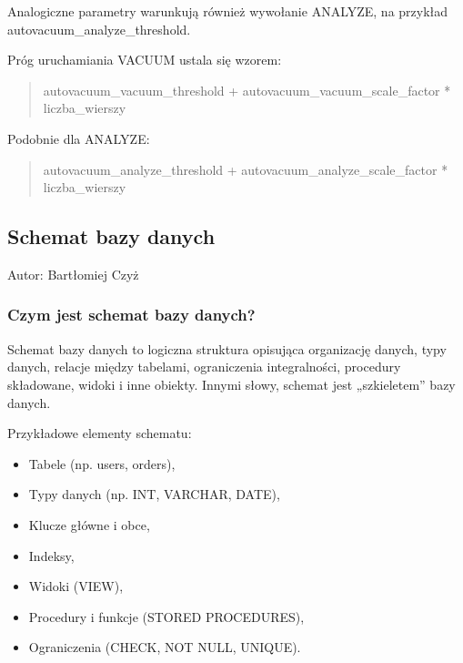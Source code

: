 \documentclass[letterpaper,10pt,polish]{sphinxmanual}
\begin{document}
\sphinxAtStartPar
Analogiczne parametry warunkują również wywołanie ANALYZE, na przykład autovacuum\_analyze\_threshold.

\sphinxAtStartPar
Próg uruchamiania VACUUM ustala się wzorem:
\begin{quote}

\sphinxAtStartPar
autovacuum\_vacuum\_threshold + autovacuum\_vacuum\_scale\_factor * liczba\_wierszy
\end{quote}

\sphinxAtStartPar
Podobnie dla ANALYZE:
\begin{quote}

\sphinxAtStartPar
autovacuum\_analyze\_threshold + autovacuum\_analyze\_scale\_factor * liczba\_wierszy
\end{quote}


\subsection{Schemat bazy danych}
\label{\detokenize{rozdzial2/Kontrola_i_konserwacja/kontrola_i_konserwacja:schemat-bazy-danych}}
\sphinxAtStartPar
Autor: Bartłomiej Czyż


\subsubsection{Czym jest schemat bazy danych?}
\label{\detokenize{rozdzial2/Kontrola_i_konserwacja/kontrola_i_konserwacja:czym-jest-schemat-bazy-danych}}
\sphinxAtStartPar
Schemat bazy danych to logiczna struktura opisująca organizację danych, typy danych, relacje między tabelami, ograniczenia integralności, procedury składowane, widoki i inne obiekty. Innymi słowy, schemat jest „szkieletem” bazy danych.

\sphinxAtStartPar
Przykładowe elementy schematu:
\begin{itemize}
\item {} 
\sphinxAtStartPar
Tabele (np. users, orders),

\item {} 
\sphinxAtStartPar
Typy danych (np. INT, VARCHAR, DATE),

\item {} 
\sphinxAtStartPar
Klucze główne i obce,

\item {} 
\sphinxAtStartPar
Indeksy,

\item {} 
\sphinxAtStartPar
Widoki (VIEW),

\item {} 
\sphinxAtStartPar
Procedury i funkcje (STORED PROCEDURES),

\item {} 
\sphinxAtStartPar
Ograniczenia (CHECK, NOT NULL, UNIQUE).

\end{itemize}
\end{document}
